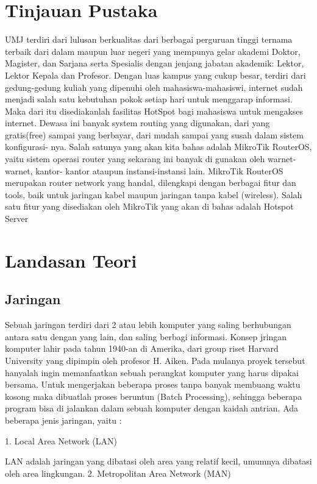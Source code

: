 \documentclass{jtetiproposalskripsi}
\begin{document}
\section{Tinjauan Pustaka}
UMJ terdiri dari lulusan berkualitas dari berbagai perguruan tinggi ternama terbaik  dari  dalam  maupun luar negeri  yang mempunya  gelar akademi Doktor, Magister, dan Sarjana serta Spesialis dengan jenjang jabatan akademik: Lektor, Lektor Kepala dan Profesor.
Dengan luas kampus yang cukup besar, terdiri dari gedung-gedung kuliah yang dipenuhi oleh mahasiswa-mahasiswi, internet sudah menjadi salah satu kebutuhan pokok setiap hari untuk menggarap informasi. Maka dari itu disediakanlah fasilitas HotSpot bagi mahasiswa untuk mengakses internet.
Dewasa ini banyak system routing yang digunakan, dari yang gratis(free) sampai yang berbayar, dari mudah sampai yang susah dalam sistem konfigurasi- nya. Salah satunya yang akan kita bahas adalah MikroTik RouterOS, yaitu sistem operasi router yang sekarang ini banyak di gunakan oleh warnet-warnet, kantor- kantor ataupun instansi-instansi lain. MikroTik RouterOS merupakan router network  yang handal, dilengkapi dengan berbagai fitur dan tools, baik untuk jaringan kabel  maupun  jaringan tanpa kabel  (wireless). Salah satu fitur  yang disediakan oleh MikroTik yang akan di bahas adalah Hotspot Server

\section{Landasan Teori}
\subsection{Jaringan }
Sebuah   jaringan   terdiri   dari   2   atau   lebih   komputer   yang   saling berhubungan antara satu dengan yang lain, dan saling berbagi informasi.
Konsep jringan komputer lahir pada tahun 1940-an di Amerika, dari group riset Harvard University yang dipimpin oleh profesor H. Aiken. Pada mulanya proyek tersebut hanyalah ingin memanfaatkan sebuah perangkat komputer yang harus dipakai bersama. Untuk mengerjakan beberapa   proses tanpa banyak membuang waktu kosong maka dibuatlah proses beruntun (Batch Processing), sehingga  beberapa  program  bisa  di  jalankan  dalam  sebuah  komputer  dengan kaidah antrian. Ada beberapa jenis jaringan, yaitu :

1.  Local Area Network (LAN)

LAN adalah jaringan yang dibatasi oleh area yang relatif kecil, umumnya dibatasi oleh area lingkungan.
2.  Metropolitan Area Network (MAN)
\end{document}

